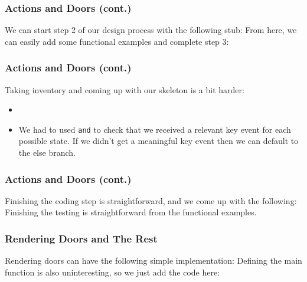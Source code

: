 \documentclass{beamer}
\begin{document}
\begin{frame}
  \frametitle{Actions and Doors (cont.)}
  We can start step 2 of our design process with the following
  stub:
  \pause
  \actionStub
  \pause
  From here, we can easily add some functional examples and complete step 3:
  \pause
  \actionExamples
\end{frame}

\begin{frame}
  \frametitle{Actions and Doors (cont.)}
  Taking inventory and coming up with our skeleton is a bit harder:
  \begin{itemize}
  \item<2-> \actionSkeleton
  \item<3-> We had to used \texttt{and} to check that we received
    a relevant key event for each possible state. If we didn't get a meaningful
    key event then we can default to the else branch.
  \end{itemize}
\end{frame}

\begin{frame}
  \frametitle{Actions and Doors (cont.)}
  Finishing the coding step is straightforward, and we come up with the
  following:
  \pause
  \actionFinal
  \pause
  Finishing the testing is straightforward from the functional examples.
\end{frame}



\begin{frame}
  \frametitle{Rendering Doors and The Rest}
  Rendering doors can have the following simple implementation:
  \pause
  \doorRender
  Defining the main function is also uninteresting, so we just add the code
  here:
  \doorMain
\end{frame}
\end{document}
